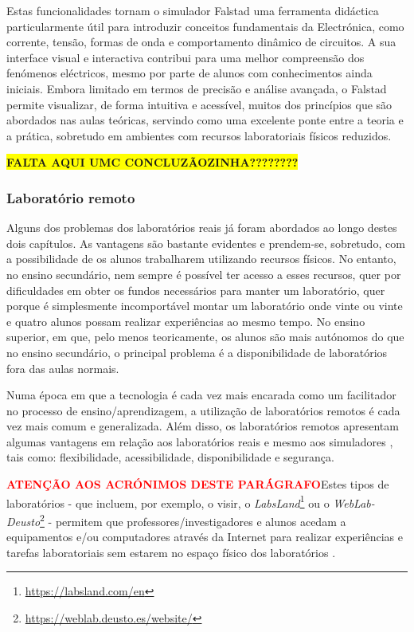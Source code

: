 Estas funcionalidades tornam o simulador Falstad uma ferramenta didáctica particularmente útil para introduzir conceitos fundamentais da Electrónica, como corrente, tensão, formas de onda e comportamento dinâmico de circuitos. A sua interface visual e interactiva contribui para uma melhor compreensão dos fenómenos eléctricos, mesmo por parte de alunos com conhecimentos ainda iniciais. Embora limitado em termos de precisão e análise avançada, o Falstad permite visualizar, de forma intuitiva e acessível, muitos dos princípios que são abordados nas aulas teóricas, servindo como uma excelente ponte entre a teoria e a prática, sobretudo em ambientes com recursos laboratoriais físicos reduzidos.

\colorbox{yellow}{\textbf{FALTA AQUI UMC CONCLUZÃOZINHA????????}}

\subsubsection{Laboratório remoto}
\label{sec: remotelaboratory}
Alguns dos problemas dos laboratórios reais já foram abordados ao longo destes dois capítulos. As vantagens são bastante evidentes e prendem-se, sobretudo, com a possibilidade de os alunos trabalharem utilizando recursos físicos. No entanto, no ensino secundário, nem sempre é possível ter acesso a esses recursos, quer por dificuldades em obter os fundos necessários para manter um laboratório, quer porque é simplesmente incomportável montar um laboratório onde vinte ou vinte e quatro alunos possam realizar experiências ao mesmo tempo. No ensino superior, em que, pelo menos teoricamente, os alunos são mais autónomos do que no ensino secundário, o principal problema é a disponibilidade de laboratórios fora das aulas normais.

Numa época em que a tecnologia é cada vez mais encarada como um facilitador no processo de ensino/aprendizagem, a utilização de laboratórios remotos é cada vez mais comum e generalizada. Além disso, os laboratórios remotos apresentam algumas vantagens em relação aos laboratórios reais e mesmo aos simuladores \cite{RemoteLabsImpactVISIR}, tais como: flexibilidade, acessibilidade, disponibilidade e segurança.

\textcolor{red}{\textbf{ATENÇÃO AOS ACRÓNIMOS DESTE PARÁGRAFO}}Estes tipos de laboratórios - que incluem, por exemplo, o \acrshort{visir}, o \textit{LabsLand}\footnote{\url{https://labsland.com/en}} ou o \textit{WebLab-Deusto}\footnote{\url{https://weblab.deusto.es/website/}} - permitem que professores/investigadores e alunos acedam a equipamentos e/ou computadores através da Internet para realizar experiências e tarefas laboratoriais sem estarem no espaço físico dos laboratórios \cite{ExperiencesRemoteLab}.

